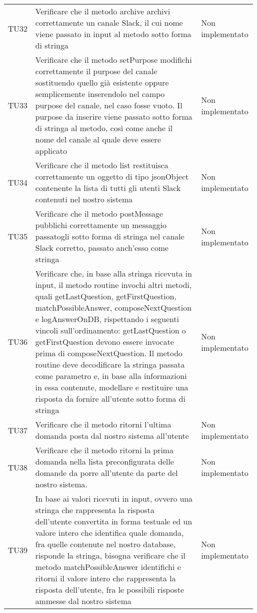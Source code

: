 \documentclass[../PianoDiQualifica.tex]{subfiles}
\begin{document}
\begin{longtable}[c] { >{\centering\arraybackslash}p{4cm} p{7cm} >{\centering\arraybackslash}p{4cm}}
			\addlinespace[0.3em]
			\midrule
			\addlinespace[0.3em]
			TU32 & Verificare che il metodo archive archivi correttamente un canale Slack, il cui nome viene passato in input al metodo sotto forma di stringa & Non implementato \\ 
			\addlinespace[0.3em]
			\midrule
			\addlinespace[0.3em]
			TU33 & Verificare che il metodo setPurpose modifichi correttamente il purpose del canale sostituendo quello già esistente oppure semplicemente inserendolo nel campo purpose del canale, nel caso fosse vuoto. Il purpose da inserire viene passato sotto forma di stringa al metodo, così come anche il nome del canale al quale deve essere applicato & Non implementato \\ 
			\addlinespace[0.3em]
			\midrule
			\addlinespace[0.3em]
			TU34 & Verificare che il metodo list restituisca correttamente un oggetto di tipo jsonObject contenente la lista di tutti gli utenti Slack contenuti nel nostro sistema & Non implementato \\ 
			\addlinespace[0.3em]
			\midrule
			\addlinespace[0.3em]
			TU35 & Verificare che il metodo postMessage pubblichi correttamente un messaggio passatogli sotto forma di stringa nel canale Slack corretto, passato anch'esso come stringa & Non implementato \\ 
			\addlinespace[0.3em]
			\midrule
			\addlinespace[0.3em]
			TU36 & Verificare che, in base alla stringa ricevuta in input, il metodo routine invochi altri metodi, quali getLastQuestion, getFirstQuestion, matchPossibleAnswer, composeNextQuestion e logAnswerOnDB, rispettando i seguenti vincoli sull'ordinamento: getLastQuestion o getFirstQuestion devono essere invocate prima di composeNextQuestion. Il metodo routine deve decodificare la stringa passata come parametro e, in base alla informazioni in essa contenute, modellare e restituire una risposta da fornire all'utente sotto forma di stringa & Non implementato \\ 
			\addlinespace[0.3em]
			\midrule
			\addlinespace[0.3em]
			TU37 & Verificare che il metodo ritorni l'ultima domanda posta dal nostro sistema all'utente & Non implementato \\ 
			\addlinespace[0.3em]
			\midrule
			\addlinespace[0.3em]
			TU38 & Verificare che il metodo ritorni la prima domanda nella lista preconfigurata delle domande da porre all'utente da parte del nostro sistema. & Non implementato \\ 
			\addlinespace[0.3em]
			\midrule
			\addlinespace[0.3em]
			TU39 & In base ai valori ricevuti in input, ovvero una stringa che rappresenta la risposta dell'utente convertita in forma testuale ed un valore intero che identifica quale domanda, fra quelle contenute nel nostro database, risponde la stringa, bisogna verificare che il metodo matchPossibleAnswer identifichi e ritorni il valore intero che rappresenta la risposta dell'utente, fra le possibili risposte ammesse dal nostro sistema & Non implementato \\ 

\end{longtable}
\end{document}
